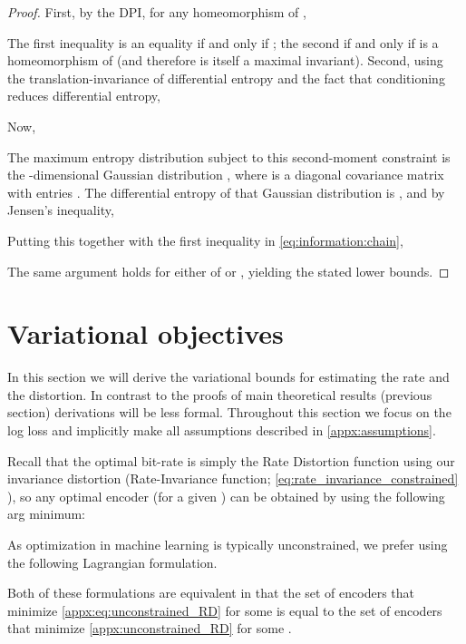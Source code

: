 \documentclass[final]{article}
\begin{document}
\begin{proof}
	First, by the DPI, for any homeomorphism  of ,
	
	The first inequality is an equality if and only if ; the second if and only if  is a homeomorphism of  (and therefore is itself a maximal invariant). Second, using the translation-invariance of differential entropy and the fact that conditioning reduces differential entropy, 
	
	Now, 
	
	The maximum entropy distribution subject to this second-moment constraint is the -dimensional Gaussian distribution , where  is a diagonal covariance matrix with entries . The differential entropy of that Gaussian distribution is , and by Jensen's inequality,
	

	Putting this together with the first inequality in \eqref{eq:information:chain},
	
	The same argument holds for either of  or , yielding the stated lower bounds.
\end{proof}




\clearpage
\newpage 
\section{Variational objectives}
\label{appx:objectives}


In this section we will derive the variational bounds for estimating the rate and the distortion.
In contrast to the proofs of main theoretical results (previous section) derivations  will be less formal.
Throughout this section we focus on the log loss and implicitly make all assumptions described in \cref{appx:assumptions}.

Recall that the optimal bit-rate is simply the Rate Distortion function using our invariance distortion (Rate-Invariance function; \cref{eq:rate_invariance_constrained} ), so any optimal encoder (for a given ) can be obtained by using the following arg minimum:

As optimization in machine learning is typically unconstrained, we prefer using the following Lagrangian formulation.

Both of these formulations are equivalent in that the set of encoders that minimize \cref{appx:eq:unconstrained_RD} for some  is equal to the set of encoders that minimize \cref{appx:unconstrained_RD} for some  \cite{everett_generalized_1963,berger_rate-distortion_2003}.
\end{document}
